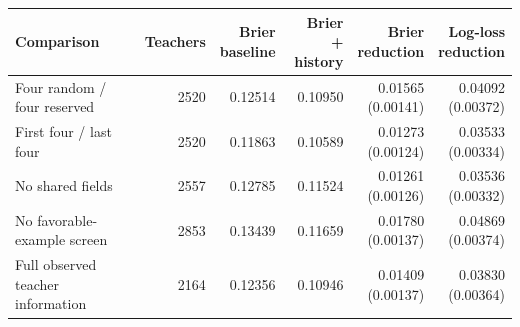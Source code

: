 \begin{tabular}{p{4.3cm}rrrrr}
\toprule
Comparison & Teachers & \shortstack{Brier\\baseline} & \shortstack{Brier\\+ history} & \shortstack{Brier\\reduction} & \shortstack{Log-loss\\reduction} \\
\midrule
Four random / four reserved & 2520 & 0.12514 & 0.10950 & \shortstack{0.01565\\{\scriptsize (0.00141)}} & \shortstack{0.04092\\{\scriptsize (0.00372)}} \\
First four / last four & 2520 & 0.11863 & 0.10589 & \shortstack{0.01273\\{\scriptsize (0.00124)}} & \shortstack{0.03533\\{\scriptsize (0.00334)}} \\
No shared fields & 2557 & 0.12785 & 0.11524 & \shortstack{0.01261\\{\scriptsize (0.00126)}} & \shortstack{0.03536\\{\scriptsize (0.00332)}} \\
No favorable-example screen & 2853 & 0.13439 & 0.11659 & \shortstack{0.01780\\{\scriptsize (0.00137)}} & \shortstack{0.04869\\{\scriptsize (0.00374)}} \\
Full observed teacher information & 2164 & 0.12356 & 0.10946 & \shortstack{0.01409\\{\scriptsize (0.00137)}} & \shortstack{0.03830\\{\scriptsize (0.00364)}} \\
\bottomrule
\end{tabular}
